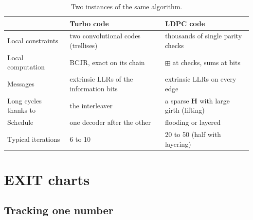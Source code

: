 \documentclass[11pt,a4paper]{article}
\theoremstyle{definition}
\theoremstyle{remark}
\begin{document}
\begin{table}[htb]
\centering\small
\begin{tabularx}{\textwidth}{@{}lXX@{}}
\toprule
 & Turbo code & LDPC code \\
\midrule
Local constraints & two convolutional codes (trellises) & thousands of single parity checks \\
Local computation & BCJR, exact on its chain & $\boxplus$ at checks, sums at bits \\
Messages & extrinsic LLRs of the information bits & extrinsic LLRs on every edge \\
Long cycles thanks to & the interleaver & a sparse $\bm{H}$ with large girth (lifting) \\
Schedule & one decoder after the other & flooding or layered \\
Typical iterations & 6 to 10 & 20 to 50 (half with layering) \\
\bottomrule
\end{tabularx}
\caption{Two instances of the same algorithm.}
\label{tab:turbo-ldpc}
\end{table}

\section{EXIT charts}
\label{sec:exit}

\subsection{Tracking one number}
\end{document}
